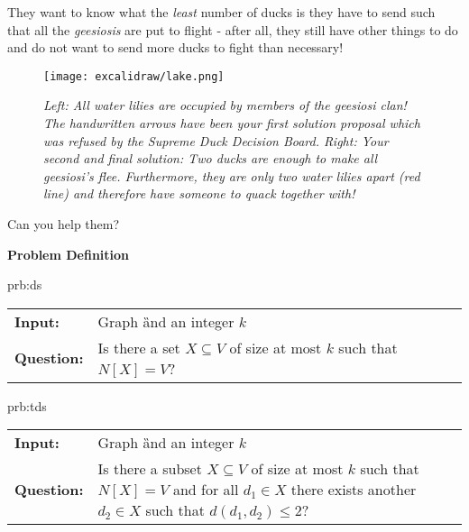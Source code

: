 They want to know what the \textit{least} number of ducks is they have to send such that all the \textit{geesiosis} are put to flight - after all, they still have other things to do and do not want to send more ducks to fight than necessary!

\begin{figure}
    \centering
    \texttt{[image: excalidraw/lake.png]}
    \caption[Introductions: Merganser Lake. Own Drawing. Embedded icons under public domain from {\href{https://creazilla.com/}{https://creazilla.com/}}]{\textit{Left: All water lilies are occupied by members of the \textit{geesiosi} clan! The handwritten arrows have been your first solution proposal which was refused by the \textit{Supreme Duck Decision Board}.
    Right: Your second and final solution: Two ducks are enough to make all \textit{geesiosi}'s flee. Furthermore, they are only two water lilies apart (red line) and therefore have someone to quack together with!}}
    \label{fig:duck-lake}
\end{figure}

Can you help them? 


\textbf{Problem Definition}

\begin{prb}{prb:ds}

    \begin{tabularx}{0.9\textwidth}{>{\hsize=0.30\hsize}X>{\hsize=0.8\hsize}X}
        \textbf{Input:} & Graph \G and an integer $k$\\
        \textbf{Question:} & Is there a set $X \subseteq V$ of size at most $k$ such that $N[X] = V$? \\
    \end{tabularx}
        
\end{prb}

\begin{prb}{prb:tds}
    
    \begin{tabularx}{0.8\textwidth}{>{\hsize=0.35\hsize}X>{\hsize=0.8\hsize}X}
        \textbf{Input:} & Graph \G and an integer $k$\\
        \textbf{Question:} & Is there a subset $X \subseteq V$ of size at most $k$ such that $N[X] = V$ and for all $d_1 \in X$ there exists another $d_2 \in X$ such that $d(d_1, d_2) \leq 2$?\\
    \end{tabularx}
        
\end{prb}

